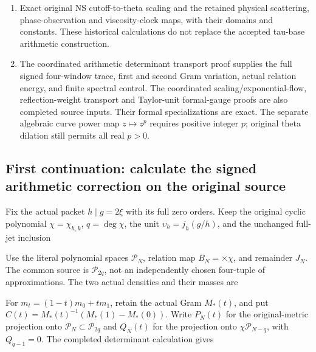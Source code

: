 \begin{enumerate}
  resonance, its kernel, all nilpotents and both Laplacian boundary
  terms. An off-weight source eigenvector satisfies the proved lower
  bound \(\|Bv\|/\|Rv\|\ge |\Re\lambda-k/2|\); quotient-boundary
  vanishing cannot delete that source vector.
\item
  Exact original NS cutoff-to-theta scaling and the retained physical
  scattering, phase-observation and viscosity-clock maps, with their
  domains and constants. These historical calculations do not replace
  the accepted tau-base arithmetic construction.
\item
  The coordinated arithmetic determinant transport proof supplies the
  full signed four-window trace, first and second Gram variation, actual
  relation energy, and finite spectral control. The coordinated
  scaling/exponential-flow, reflection-weight transport and Taylor-unit
  formal-gauge proofs are also completed source inputs. Their formal
  specializations are exact. The separate algebraic curve power map
  \(z\mapsto z^p\) requires positive integer \(p\); original theta
  dilation still permits all real \(p>0\).
\end{enumerate}

\subsection{First continuation: calculate the signed arithmetic
correction on the original
source}\label{TranscriptLedgerStage:first-continuation-calculate-the-signed-arithmetic-correction-on-the-original-source}

Fix the actual packet \(h\mid g=2\xi\) with its full zero orders. Keep
the original cyclic polynomial \(\chi=\chi_{h,k}\), \(q=\deg\chi\), the
unit \(\upsilon_h=j_h(g/h)\), and the unchanged full-jet inclusion


Use the literal polynomial spaces \(\mathcal P_N\), relation map
\(B_N=\times\chi\), and remainder \(J_N\). The common source is
\(\mathcal P_{2q}\), not an independently chosen four-tuple of
approximations. The two actual densities and their masses are

 

For \(m_t=(1-t)m_0+tm_1\), retain the actual Gram \(M_*(t)\), and put
\(C(t)=M_*(t)^{-1}(M_*(1)-M_*(0))\). Write \(P_N(t)\) for the
original-metric projection onto \(\mathcal P_N\subset\mathcal P_{2q}\)
and \(Q_N(t)\) for the projection onto \(\chi\mathcal P_{N-q}\), with
\(Q_{q-1}=0\). The completed determinant calculation gives

